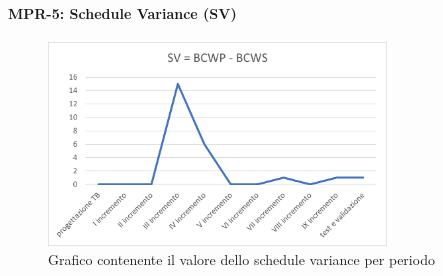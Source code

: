 \newpage

\paragraph{MPR-5: Schedule Variance (SV)}\label{_SV}
\begin{center}
    \begin{figure}[!htb]
    \centering
    \includegraphics[width=0.8\textwidth]{res/images/metriche_costi/SV.png}
    \caption{Grafico contenente il valore dello schedule variance per periodo}
\end{figure}
\end{center}

